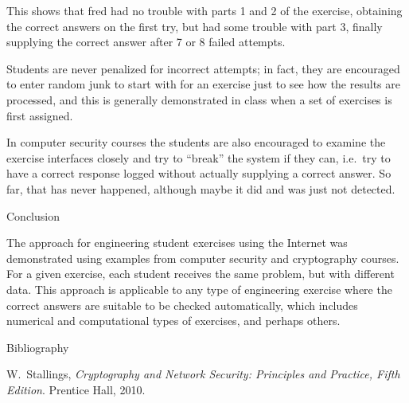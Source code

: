 \documentclass[12pt]{article}
\begin{document}
This shows that fred had no trouble with parts 1 and 2 of the exercise,
obtaining the correct answers on the first try, but had some trouble
with part 3, finally supplying the correct answer after 7 or 8 failed
attempts.

\vspace{11pt}

Students are never penalized for incorrect attempts; in fact, they are encouraged to 
enter random junk to start with for an exercise just to see how the results
are processed, and this is generally demonstrated in class when a set of exercises
is first assigned.

\vspace{11pt}

In computer security courses the
students are also encouraged to examine the exercise interfaces closely and
try to ``break'' the system if they can, i.e.\ try to have a correct
response logged without actually supplying a correct answer.
So far, that has never happened, although maybe it did and was just
not detected.

\vspace{22pt}
Conclusion
\vspace{11pt}

The approach for engineering student exercises using the Internet
was demonstrated using
examples from computer security and cryptography courses.
For a given exercise, each student
receives the same problem, but with different data.  
This approach is applicable to any type of engineering exercise
where the correct answers are suitable to be checked automatically,
which includes numerical and computational types of exercises, and perhaps others.



\vspace{22pt}
Bibliography
\vspace{-44pt}



\begin{thebibliography}{1}

W.~Stallings, {\em Cryptography and Network Security: Principles and Practice,
  Fifth Edition}.
\newblock Prentice Hall, 2010.

\end{thebibliography}
\end{document}
